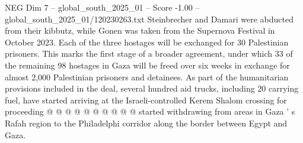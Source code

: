 \begin{textsample}{NEG Dim 7 – global\_south\_2025\_01 – Score -1.00 – global\_south\_2025\_01/120230263.txt}
Steinbrecher and Damari were abducted from their kibbutz, while Gonen was taken from the Supernova Festival in October 2023.
Each of the three hostages will be exchanged for 30 Palestinian prisoners.
This marks the first stage of a broader agreement, under which 33 of the remaining 98 hostages in Gaza will be freed over six weeks in exchange for almost 2,000 Palestinian prisoners and detainees.
As part of the humanitarian provisions included in the deal, several hundred aid trucks, including 20 carrying fuel, have started arriving at the Israeli-controlled Kerem Shalom crossing for proceeding @ @ @ @ @ @ @ @ @ @ started withdrawing from areas in Gaza ' s Rafah region to the Philadelphi corridor along the border between Egypt and Gaza.

\end{textsample}
